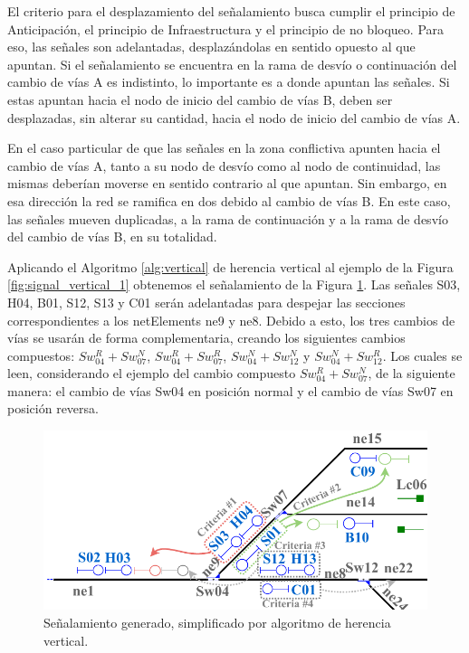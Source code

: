     El criterio para el desplazamiento del señalamiento busca cumplir el principio de Anticipación, el principio de Infraestructura y el principio de no bloqueo. Para eso, las señales son adelantadas, desplazándolas en sentido opuesto al que apuntan. Si el señalamiento se encuentra en la rama de desvío o continuación del cambio de vías A es indistinto, lo importante es a donde apuntan las señales. Si estas apuntan hacia el nodo de inicio del cambio de vías B, deben ser desplazadas, sin alterar su cantidad, hacia el nodo de inicio del cambio de vías A. 
    
    En el caso particular de que las señales en la zona conflictiva apunten hacia el cambio de vías A, tanto a su nodo de desvío como al nodo de continuidad, las mismas deberían moverse en sentido contrario al que apuntan. Sin embargo, en esa dirección la red se ramifica en dos debido al cambio de vías B. En este caso, las señales mueven duplicadas, a la rama de continuación y a la rama de desvío del cambio de vías B, en su totalidad.
    
    Aplicando el Algoritmo \ref{alg:vertical} de herencia vertical al ejemplo de la Figura \ref{fig:signal_vertical_1} obtenemos el señalamiento de la Figura \ref{fig:signal_vertical_2}. Las señales S03, H04, B01, S12, S13 y C01 serán adelantadas para despejar las secciones correspondientes a los netElements ne9 y ne8. Debido a esto, los tres cambios de vías se usarán de forma complementaria, creando los siguientes cambios compuestos: $Sw_{04}^R+Sw_{07}^N$, $Sw_{04}^R+Sw_{07}^R$, $Sw_{04}^N+Sw_{12}^N$ y $Sw_{04}^N+Sw_{12}^R$. Los cuales se leen, considerando el ejemplo del cambio compuesto $Sw_{04}^R+Sw_{07}^N$, de la siguiente manera: el cambio de vías Sw04 en posición normal y el cambio de vías Sw07 en posición reversa.
    
    \begin{figure}[h!]
    	\centering
    	\includegraphics[width=1\textwidth]{Figuras/Figure9_Crop.pdf}
    	\centering\caption{Señalamiento generado, simplificado por algoritmo de herencia vertical.}
    	\label{fig:signal_vertical_2}
    \end{figure}
    
